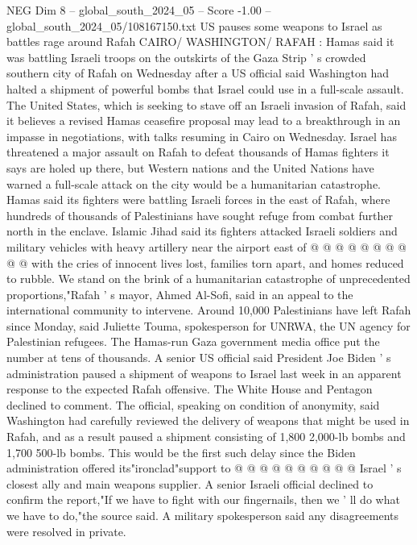\begin{textsample}{NEG Dim 8 – global\_south\_2024\_05 – Score -1.00 – global\_south\_2024\_05/108167150.txt}  \label{ex:f8_neg_105}
US pauses some weapons to Israel as battles rage around Rafah CAIRO/ WASHINGTON/ RAFAH : Hamas said it was battling Israeli troops on the outskirts of the Gaza Strip ' s crowded southern city of Rafah on Wednesday after a US official said Washington had halted a shipment of powerful bombs that Israel could use in a full-scale assault.
The United States, which is seeking to stave off an Israeli invasion of Rafah, said it believes a revised Hamas ceasefire proposal may lead to a breakthrough in an impasse in negotiations, with talks resuming in Cairo on Wednesday.
Israel has threatened a major assault on Rafah to defeat thousands of Hamas fighters it says are holed up there, but Western nations and the United Nations have warned a full-scale attack on the city would be a humanitarian catastrophe.
Hamas said its fighters were battling Israeli forces in the east of Rafah, where hundreds of thousands of Palestinians have sought refuge from combat further north in the enclave.
Islamic Jihad said its fighters attacked Israeli soldiers and military vehicles with heavy artillery near the airport east of @ @ @ @ @ @ @ @ @ @ with the cries of innocent lives lost, families torn apart, and homes reduced to rubble.
We stand on the brink of a humanitarian catastrophe of unprecedented proportions,"Rafah ' s mayor, Ahmed Al-Sofi, said in an appeal to the international community to intervene.
Around 10,000 Palestinians have left Rafah since Monday, said Juliette Touma, spokesperson for UNRWA, the UN agency for Palestinian refugees.
The Hamas-run Gaza government media office put the number at tens of thousands.
A senior US official said President Joe Biden ' s administration paused a shipment of weapons to Israel last week in an apparent response to the expected Rafah offensive.
The White House and Pentagon declined to comment.
The official, speaking on condition of anonymity, said Washington had carefully reviewed the delivery of weapons that might be used in Rafah, and as a result paused a shipment consisting of 1,800 2,000-lb bombs and 1,700 500-lb bombs.
This would be the first such delay since the Biden administration offered its"ironclad"support to @ @ @ @ @ @ @ @ @ @ Israel ' s closest ally and main weapons supplier.
A senior Israeli official declined to confirm the report,"If we have to fight with our fingernails, then we ' ll do what we have to do,"the source said.
A military spokesperson said any disagreements were resolved in private.

\end{textsample}
